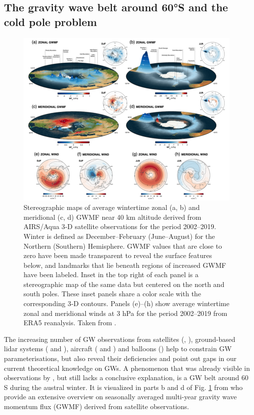 \subsection{The gravity wave belt around 60°S and the cold pole problem}
\label{sec:waveBelt} %
%
\begin{figure}[h]
    \centering
    \includegraphics[width=0.99\textwidth]{Figures/hindley_2020_GWMF.png}
    \caption{Stereographic maps of average wintertime zonal (a, b) and meridional (c, d) GWMF near 40 km altitude derived from AIRS/Aqua 3‐D satellite observations for the period 2002–2019. Winter is defined as December–February (June–August) for the Northern (Southern) Hemisphere. GWMF values that are close to zero have been made transparent to reveal the surface features below, and landmarks that lie beneath regions of increased GWMF have been labeled. Inset in the top right of each panel is a stereographic map of the same data but centered on the north and south poles. These inset panels share a color scale with the corresponding 3‐D contours. Panels (e)–(h) show average wintertime zonal and meridional winds at 3 hPa for the period 2002–2019 from ERA5 reanalysis. Taken from \cite{hindley_18year_2020}.}
    \label{fig:hindley_2020_GWMF}
\end{figure}
%
The increasing number of GW observations from satellites (\cite{hindley_gravity_2019}, \citeyear{hindley_18year_2020}), ground-based lidar systems (\cite{kaifler_lidar_2020} and  \cite{kaifler_compact_2021}), aircraft (\cite{rapp_southtrac-gw_2021} and \cite{fritts_deep_2016}) and  balloons (\cite{plougonven_gravity_2013}) help to constrain GW parameterisations, but also reveal their deficiencies and point out gaps in our current theoretical knowledge on GWs. A phenomenon that was already visible in observations by \textcite{wu_satellite_1996}, but still lacks a conclusive explanation, is a GW belt around 60 \degree S during the austral winter. It is visualized in parts b and d of Fig. \ref{fig:hindley_2020_GWMF} from \textcite{hindley_18year_2020} who provide an extensive overview on seasonally averaged multi-year gravity wave momentum flux (GWMF) derived from satellite observations.


